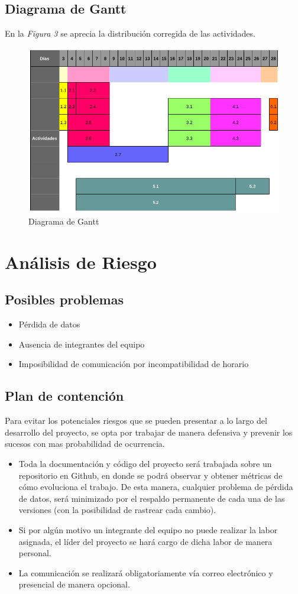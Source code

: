 \documentclass[letterpaper]{article}
\begin{document}
\subsection{Diagrama de Gantt}
En la \emph{Figura 3} se aprecia la distribución corregida de las actividades.
\begin{figure}[h!]
  \centering
  \includegraphics[width=.80\textwidth]{Gantt.png}
  \caption{Diagrama de Gantt}
\end{figure}

\section{Análisis de Riesgo}

\subsection{Posibles problemas}
\begin{itemize}
\item Pérdida de datos
\item Ausencia de integrantes del equipo
\item Imposibilidad de comunicación por incompatibilidad de horario
\end{itemize}

\subsection{Plan de contención}
Para evitar los potenciales riesgos que se pueden presentar a lo largo del desarrollo del proyecto, se opta por trabajar de manera defensiva y prevenir los sucesos con mas probabilidad de ocurrencia.

\begin{itemize}
\item Toda la documentación y código del proyecto será trabajada sobre un repositorio en Github, en donde se podrá observar y obtener métricas de cómo evoluciona el trabajo. De esta manera, cualquier problema de pérdida de datos, será minimizado por el respaldo permanente de cada una de las versiones (con la posibilidad de rastrear cada cambio).
\item Si por algún motivo un integrante del equipo no puede realizar la labor asignada, el líder del proyecto se hará cargo de dicha labor de manera personal.
\item La comunicación se realizará obligatoriamente vía correo electrónico y presencial de manera opcional.
\end{itemize}
\end{document}

